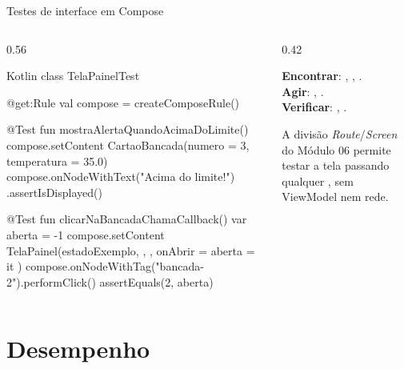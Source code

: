 \documentclass[aspectratio=169,10pt]{beamer}
\begin{document}
\begin{frame}[fragile]{Testes de interface em Compose}
  \begin{columns}[T]
    \begin{column}{0.56\textwidth}
\begin{codigo}[title=TelaPainelTest.kt]{Kotlin}
class TelaPainelTest {
  @get:Rule val compose = createComposeRule()

  @Test fun mostraAlertaQuandoAcimaDoLimite() {
    compose.setContent {
      CartaoBancada(numero = 3, temperatura = 35.0)
    }
    compose.onNodeWithText("Acima do limite!")
      .assertIsDisplayed()
  }

  @Test fun clicarNaBancadaChamaCallback() {
    var aberta = -1
    compose.setContent {
      TelaPainel(estadoExemplo, {}, {}, onAbrir = { aberta = it })
    }
    compose.onNodeWithTag("bancada-2").performClick()
    assertEquals(2, aberta)
  }
}
\end{codigo}
    \end{column}
    \begin{column}{0.42\textwidth}
      \begin{conceito}
        \scriptsize
        \textbf{Encontrar}: , , .\\
        \textbf{Agir}: , .\\
        \textbf{Verificar}: , .
      \end{conceito}
      \begin{conceito}
        A divisão \emph{Route}/\emph{Screen} do Módulo 06 permite testar a tela passando qualquer , sem ViewModel nem rede.
      \end{conceito}
    \end{column}
  \end{columns}
\end{frame}

\section{Desempenho}
\end{document}
